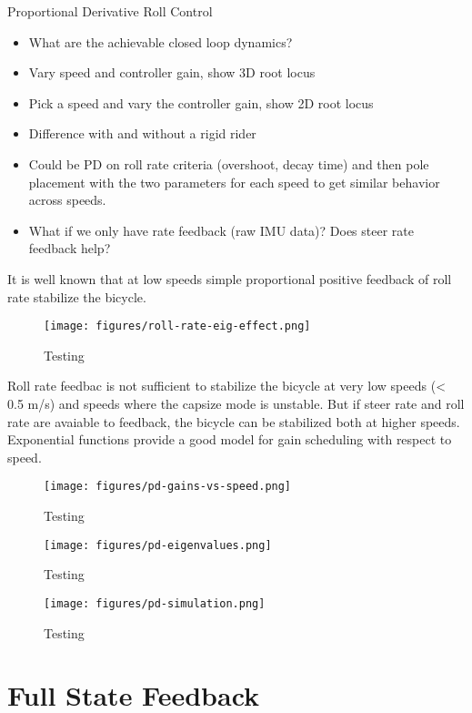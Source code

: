 \documentclass[12pt]{article}
\begin{document}
Proportional Derivative Roll Control

\begin{itemize}
  \item What are the achievable closed loop dynamics?
  \item Vary speed and controller gain, show 3D root locus
  \item Pick a speed and vary the controller gain, show 2D root locus
  \item Difference with and without a rigid rider
  \item Could be PD on roll rate criteria (overshoot, decay time) and then pole
    placement with the two parameters for each speed to get similar behavior
    across speeds.
  \item What if we only have rate feedback (raw IMU data)? Does steer rate
    feedback help?
\end{itemize}

It is well known that at low speeds simple proportional positive feedback of
roll rate stabilize the bicycle.

\begin{figure}
  \centering
  \texttt{[image: figures/roll-rate-eig-effect.png]}
  \caption{Testing}
  \label{fig:roll-rate-eig-effect}
\end{figure}

Roll rate feedbac is not sufficient to stabilize the bicycle at very low speeds
(< 0.5 m/s) and speeds where the capsize mode is unstable. But if steer rate
and roll rate are avaiable to feedback, the bicycle can be stabilized both at
higher speeds. Exponential functions provide a good model for gain scheduling
with respect to speed.

\begin{figure}
  \centering
  \texttt{[image: figures/pd-gains-vs-speed.png]}
  \caption{Testing}
  \label{fig:pd-gains-vs-speed}
\end{figure}

\begin{figure}
  \centering
  \texttt{[image: figures/pd-eigenvalues.png]}
  \caption{Testing}
  \label{fig:pd-eigenvalues}
\end{figure}

\begin{figure}
  \centering
  \texttt{[image: figures/pd-simulation.png]}
  \caption{Testing}
  \label{fig:pd_simulation}
\end{figure}

\section{Full State Feedback}
\end{document}
